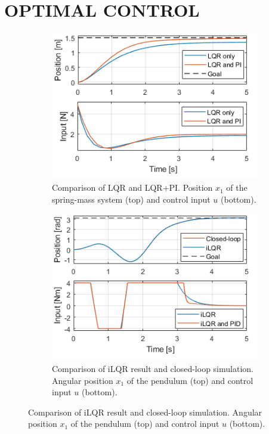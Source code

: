 \documentclass[letterpaper, 10 pt, conference]{ieeeconf}  %
\begin{document}
\section{OPTIMAL CONTROL}
\begin{figure}[!thp] 
	\centering
	\begin{subfigure}{0.325\textwidth}
		\includegraphics[width=\textwidth]{MS.png}
		\caption{Comparison of LQR and LQR+PI. Position $x_1$ of the spring-mass system (top) and control input $u$ (bottom).}\label{fig:JanSM}
	\end{subfigure}
	\begin{subfigure}{0.325\textwidth}
		\includegraphics[width=\textwidth]{P1.png}
		\caption{Comparison of iLQR result and closed-loop simulation. Angular position $x_1$ of the pendulum (top) and control input $u$ (bottom).}\label{fig:JanP1}

\end{subfigure}
\end{figure}
\end{document}
